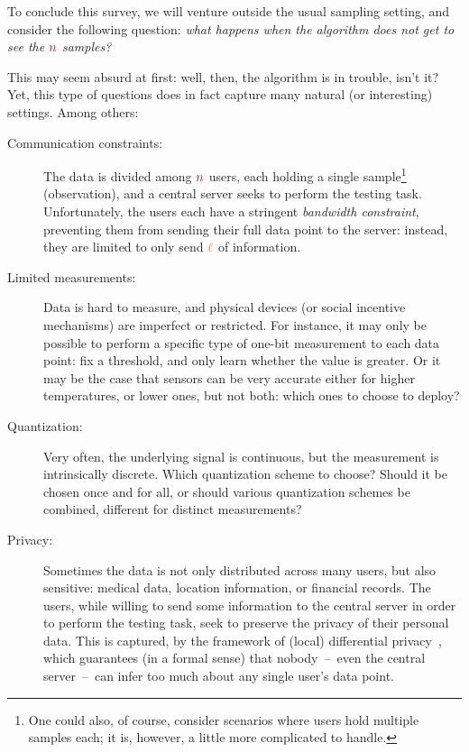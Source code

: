 
To conclude this survey, we will venture outside the usual sampling setting, and consider the following question: \emph{what happens when the algorithm does not get to see the ${\textcolor{purple}{n}}$ \iid samples?}

This may seem absurd at first: well, then, the algorithm is in trouble, isn't it? Yet, this type of questions does in fact capture many natural (or interesting) settings. Among others:
\begin{description}
	\item[Communication constraints:] The data is divided among ${\textcolor{purple}{n}}$ users, each holding a single sample\footnote{One could also, of course, consider scenarios where users hold multiple samples each; it is, however, a little more complicated to handle.} (observation), and a central server seeks to perform the testing task. Unfortunately, the users each have a stringent \emph{bandwidth constraint}, preventing them from sending their full data point to the server: instead, they are limited to only send ${\textcolor{orange}{\ell}}$ of information.
	\item[Limited measurements:] Data is hard to measure, and physical devices (or social incentive mechanisms) are imperfect or restricted. For instance, it may only be possible to perform a specific type of one-bit measurement to each data point: fix a threshold, and only learn whether the value is greater. Or it may be the case that sensors can be very accurate either for higher temperatures, or lower ones, but not both: which ones to choose to deploy?
	\item[Quantization:] Very often, the underlying signal is continuous, but the measurement is intrinsically discrete. Which quantization scheme to choose? Should it be chosen once and for all, or should various quantization schemes be combined, different for distinct measurements?
	\item[Privacy:] Sometimes the data is not only distributed across many users, but also sensitive: \eg medical data, location information, or financial records. The users, while willing to send some information to the central server in order to perform the testing task, seek to preserve the privacy of their personal data. This is captured, \eg by the framework of (local) differential privacy~\citep{DworkMNS06,KLNRS:11,DJW:13:FOCS}, which guarantees (in a formal sense) that nobody~--~even the central server~--~can infer too much about any single user's data point.

\end{description}
